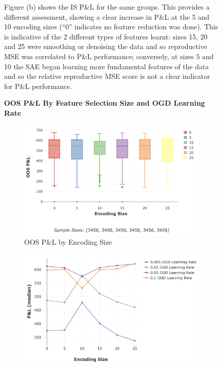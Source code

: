 \documentclass[a4paper,11pt,oneside]{article}
\theoremstyle{plain}
\theoremstyle{definition}
\begin{document}
\begin{figure}[H]
{		\newline Figure (b) shows the IS P\&L for the same groups. This provides a different assessment, showing a clear increase in P\&L at the 5 and 10 encoding sizes (``0'' indicates no feature reduction was done). This is indicative of the 2 different types of features learnt: sizes 15, 20 and 25 were smoothing or denoising the data and so reproductive MSE was correlated to P\&L performance; conversely, at sizes 5 and 10 the SAE began learning more fundamental features of the data and so the relative reproductive MSE score is not a clear indicator for P\&L performance.}
	\end{figure}
	
	\begin{figure}[H]
		\centering 
		\textbf{OOS P\&L By Feature Selection Size and OGD Learning Rate}
		\begin{subfigure}{1.0\linewidth}
			\includegraphics[scale=0.45]{images/results/8_2_determinants/OOS_Encoding_PL_Box.png} 
			\caption[OOS P\&L by Encoding Size]{OOS P\&L by Encoding Size}
			\label{figure_OOS_Encoding_PL_Box}
		\end{subfigure}	
		\begin{subfigure}{1.0\linewidth}
			\includegraphics[scale=0.45]{images/results/8_2_determinants/encoding_pl_median.png} 

\end{subfigure}
\end{figure}
\end{document}
